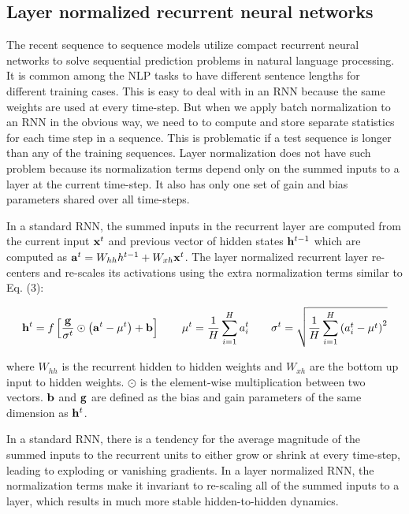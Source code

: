 \subsection{Layer normalized recurrent neural networks}

The recent sequence to sequence models \citep{sutskever2014sequence} utilize compact recurrent neural networks to solve sequential prediction problems in natural language processing.  It is common among the NLP tasks to have different sentence lengths for different training cases. This is easy to deal with in an RNN because the same weights are used at every time-step. But when we apply batch normalization to an RNN in the obvious way, we need to to compute and store separate statistics for each time step in a sequence. This is problematic if a test sequence is longer than any of the training sequences. Layer normalization does not have such problem because its normalization terms depend only on the summed inputs to a layer at the current time-step. It also has only one set of gain and bias parameters shared over all time-steps.

In a standard RNN, the summed inputs in the recurrent layer are computed from the current input ${\bold x}^t$ and previous vector of hidden states ${\bold h}^{t-1}$ which are computed as ${\bold a}^t = {W}_{hh} {h}^{t-1} + {W}_{xh} {\bold x}^t$. The layer normalized recurrent layer re-centers and re-scales its activations using the extra normalization terms similar to Eq. (3):

\begin{equation}
{\bold h}^t = {f}\left[{{\bold g}\over\sigma^t}\odot\left({\bold a}^t - \mu^t\right) + {\bold b} \right]
\qquad
\mu^t = \frac{1}{H}\sum_{i = 1}^H  {a_i^t}
\qquad
\sigma^t = \sqrt{\frac{1}{H}\sum_{i = 1}^H  \left( {a_i^t} - \mu^t \right)^2}
\end{equation}

where ${W}_{hh}$ is the recurrent hidden to hidden weights and ${W}_{xh}$ are the bottom up input to hidden weights. $\odot$ is the element-wise multiplication between two vectors. ${\bold b}$ and ${\bold g}$ are defined as the bias and gain parameters of the same dimension as ${\bold h}^t$.

In a standard RNN, there is a tendency for the average magnitude of the summed inputs to the recurrent units to either grow or shrink at every time-step, leading to exploding or vanishing gradients. In a layer normalized RNN,  the normalization terms make it invariant to re-scaling all of the summed inputs to a layer, which results in much more stable hidden-to-hidden dynamics. 

